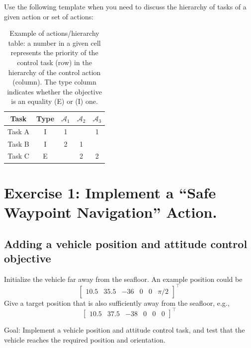 \documentclass{article}
\begin{document}
Use the following template when you need to discuss the hierarchy of tasks of a given action or set of actions:
\begin{table}[htb]
	\caption{Example of actions/hierarchy table: a number in a given cell represents the priority of the control task (row) in the hierarchy of the control action (column). The type column indicates whether the objective is an equality (E) or  (I) one.}
	\label{tbl:actions_table}
	\begin{center}
		\footnotesize
		\begin{tabular}{ccccc}
			\toprule
			Task & Type & $\mathcal{A}_{1}$ & $\mathcal{A}_{2}$ & $\mathcal{A}_{3} $	 \\
			\midrule
			Task A                    & I & 1 &   & 1  \\
			\hdashline
			Task B                & I & 2 & 1 &   \\
			\hdashline
			Task C                       & E &   & 2 & 2   \\

			\bottomrule
		\end{tabular}
	\end{center}
\end{table}%

\clearpage


\section{Exercise 1: Implement a “Safe Waypoint Navigation” Action.}

\subsection{Adding a vehicle position and attitude control objective}
Initialize the vehicle far away from the seafloor. An example position could be
\begin{displaymath}
\begin{bmatrix} 10.5 & 35.5 & -36 & 0 & 0 & \pi/2\end{bmatrix}^\top
\end{displaymath} 
Give a target position that is also sufficiently away from the seafloor, e.g.,
\begin{displaymath}
\begin{bmatrix} 10.5 & 37.5 & -38 & 0 & 0 & 0 \end{bmatrix}^\top
\end{displaymath}

Goal: Implement a vehicle position and attitude control task, and test that the vehicle reaches the required position and orientation.
\end{document}

